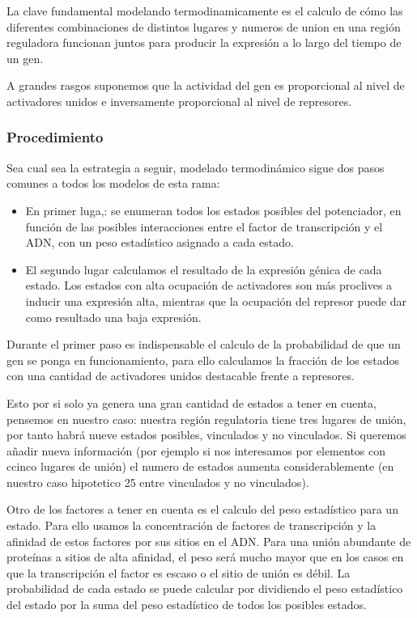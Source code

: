  
 La clave fundamental modelando termodinamicamente es el calculo de cómo las diferentes combinaciones de distintos lugares y numeros de union en una región reguladora funcionan juntos para producir la expresión a lo largo del tiempo de un gen.
 
 A grandes rasgos suponemos que la actividad del gen es proporcional al nivel de activadores unidos e inversamente proporcional al nivel de represores.
 
 \subsubsection{Procedimiento}
 
  Sea cual sea la estrategia a seguir, modelado termodinámico sigue dos pasos comunes a todos los modelos de esta rama:
  \begin{itemize}
  	\item En primer luga,: se enumeran todos los estados posibles del potenciador, en función de las posibles interacciones entre el factor de transcripción y el ADN, con un peso estadístico asignado a cada estado.
  	\item  El segundo lugar calculamos el resultado de la expresión génica de cada estado. Los estados con alta ocupación de activadores son más proclives a inducir una expresión alta, mientras que la ocupación del represor puede dar como resultado una baja expresión.
  \end{itemize}
  
   Durante el primer paso es indispensable el calculo de la probabilidad de que un gen se ponga en funcionamiento, para ello calculamos la fracción de los estados con una cantidad de activadores unidos destacable frente a represores.
   
   Esto por si solo ya genera una gran cantidad de estados a tener en cuenta, pensemos en nuestro caso: nuestra región regulatoria tiene tres lugares de unión, por tanto habrá nueve estados posibles, vinculados y no vinculados. Si queremos añadir nueva información (por ejemplo si nos interesamos por elementos con ccinco lugares de unión) el numero de estados aumenta considerablemente (en nuestro caso hipotetico 25 entre vinculados y no vinculados).
 
 
 Otro de los factores a tener en cuenta es el calculo del peso estadístico para un estado. Para ello usamos la concentración de factores de transcripción
 y la afinidad de estos factores por sus sitios en el ADN. Para una unión abundante de proteínas a sitios de alta afinidad, el peso será mucho mayor que en los casos en que la transcripción el factor es escaso o el sitio de unión es débil.
  La probabilidad de cada estado se puede calcular por
 dividiendo el peso estadístico del estado por la suma del peso estadístico de todos los posibles
 estados. 
 
